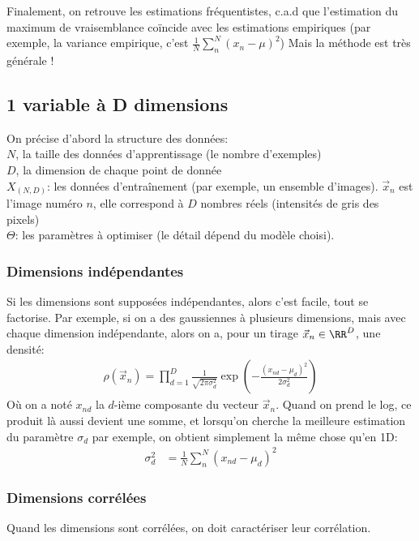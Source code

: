 \documentclass[french,twoside]{article}
\begin{document}
Finalement, on retrouve les estimations fréquentistes, c.a.d que l'estimation du maximum de vraisemblance coïncide avec les estimations empiriques (par exemple, la variance empirique, c'est $ \frac1N \sum_n^N(x_n-\mu)^2$)
Mais la méthode est très générale !

\subsection{1 variable à D dimensions}

On précise d'abord la structure des données:\\
$N$, la taille des données d'apprentissage (le nombre d'exemples)\\
$D$, la dimension de chaque point de donnée \\
$X_{(N,D)}$: les données d’entraînement (par exemple, un ensemble d'images). $\vec{x}_n$ est l'image numéro $n$, elle correspond à $D$ nombres réels (intensités de gris des pixels)\\
$\Theta$: les paramètres à optimiser (le détail dépend du modèle choisi).

\subsubsection{Dimensions indépendantes}

Si les dimensions sont supposées indépendantes, alors c'est facile, tout se factorise. Par exemple, si on a des gaussiennes à plusieurs dimensions, mais avec chaque dimension indépendante, alors on a, pour un tirage $\vec{x}_n\in \RR^D$, une densité: 
\begin{align}
\rho(\vec{x}_n) = \prod_{d=1}^D \frac{1}{\sqrt{2\pi \sigma_d^2}} \exp\left( -\frac{(x_{nd}-\mu_d)^2}{2\sigma_d^2}\right)
\end{align}
Où on a noté $x_{nd}$ la $d$-ième composante du vecteur $\vec{x}_n$.
Quand on prend le log, ce produit là aussi devient une somme, et lorsqu'on cherche la meilleure estimation du paramètre $\sigma_d$ par exemple, on obtient simplement la même chose qu'en 1D:
\begin{align}
\sigma_d^2 &= \frac1N \sum_n^N(x_{nd}-\mu_d)^2
\end{align}


\subsubsection{Dimensions corrélées}

Quand les dimensions sont corrélées, on doit caractériser leur corrélation.
\end{document}
